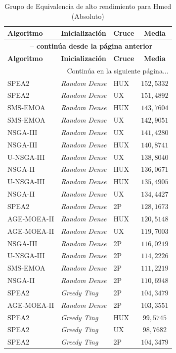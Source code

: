 \begin{longtable}{lllc}
    \caption{Grupo de Equivalencia de alto rendimiento para Hmed (Absoluto)}
    \label{tab:elite_avghd_abs} \\
    \toprule
    \textbf{Algoritmo} & \textbf{Inicialización} & \textbf{Cruce} & \textbf{Media} \\
    \midrule
    \endfirsthead
    \multicolumn{4}{c}{{\bfseries \tablename\ \thetable{} -- continúa desde la página anterior}} \\
    \toprule
    \textbf{Algoritmo} & \textbf{Inicialización} & \textbf{Cruce} & \textbf{Media} \\
    \midrule
    \endhead
    \midrule \multicolumn{4}{r}{{Continúa en la siguiente página...}} \\
    \endfoot
    \bottomrule
    \endlastfoot
    SPEA2 & \textit{Random Dense} & HUX & $152{,}5332$ \\
SPEA2 & \textit{Random Dense} & UX & $151{,}4892$ \\
SMS-EMOA & \textit{Random Dense} & HUX & $143{,}7604$ \\
SMS-EMOA & \textit{Random Dense} & UX & $142{,}9051$ \\
NSGA-III & \textit{Random Dense} & UX & $141{,}4280$ \\
NSGA-III & \textit{Random Dense} & HUX & $140{,}8741$ \\
U-NSGA-III & \textit{Random Dense} & UX & $138{,}8040$ \\
NSGA-II & \textit{Random Dense} & HUX & $136{,}0671$ \\
U-NSGA-III & \textit{Random Dense} & HUX & $135{,}4905$ \\
NSGA-II & \textit{Random Dense} & UX & $134{,}4427$ \\
SPEA2 & \textit{Random Dense} & 2P & $128{,}1673$ \\
AGE-MOEA-II & \textit{Random Dense} & HUX & $120{,}5148$ \\
AGE-MOEA-II & \textit{Random Dense} & UX & $119{,}7003$ \\
NSGA-III & \textit{Random Dense} & 2P & $116{,}0219$ \\
U-NSGA-III & \textit{Random Dense} & 2P & $114{,}2226$ \\
SMS-EMOA & \textit{Random Dense} & 2P & $111{,}2219$ \\
NSGA-II & \textit{Random Dense} & 2P & $110{,}6948$ \\
SPEA2 & \textit{Greedy Ting} & 2P & $104{,}3479$ \\
AGE-MOEA-II & \textit{Random Dense} & 2P & $103{,}3551$ \\
SPEA2 & \textit{Greedy Ting} & HUX & $99{,}5745$ \\
SPEA2 & \textit{Greedy Ting} & UX & $98{,}7682$ \\
SPEA2 & \textit{Greedy Ting} & 2P & $104{,}3479$ \\
\end{longtable}

